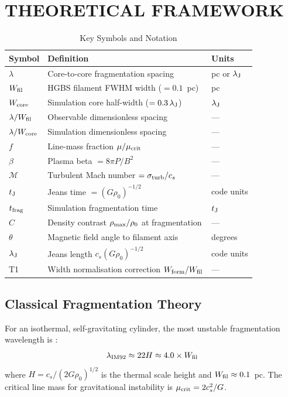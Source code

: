 \documentclass[twoside,twocolumn]{mnras}
\begin{document}
\section{THEORETICAL FRAMEWORK}

\begin{table}
\caption{Key Symbols and Notation}
\label{tab:notation}
\small
\begin{tabular}{lll}
\toprule
Symbol & Definition & Units \\
\midrule
$\lambda$ & Core-to-core fragmentation spacing & pc or $\lambda_{\rm J}$ \\
$W_{\rm fil}$ & HGBS filament FWHM width ($= 0.1$~pc) & pc \\
$W_{\rm core}$ & Simulation core half-width ($= 0.3\,\lambda_{\rm J}$) & $\lambda_{\rm J}$ \\
$\lambda/W_{\rm fil}$ & Observable dimensionless spacing & --- \\
$\lambda/W_{\rm core}$ & Simulation dimensionless spacing & --- \\
$f$ & Line-mass fraction $\mu/\mu_{\rm crit}$ & --- \\
$\beta$ & Plasma beta $= 8\pi P/B^2$ & --- \\
$\mathcal{M}$ & Turbulent Mach number $= \sigma_{\rm turb}/c_s$ & --- \\
$t_{\rm J}$ & Jeans time $= (G\rho_0)^{-1/2}$ & code units \\
$t_{\rm frag}$ & Simulation fragmentation time & $t_{\rm J}$ \\
$C$ & Density contrast $\rho_{\rm max}/\rho_0$ at fragmentation & --- \\
$\theta$ & Magnetic field angle to filament axis & degrees \\
$\lambda_{\rm J}$ & Jeans length $c_s(G\rho_0)^{-1/2}$ & code units \\
T1 & Width normalisation correction $W_{\rm form}/W_{\rm fil}$ & --- \\
\bottomrule
\end{tabular}
\end{table}

\subsection{Classical Fragmentation Theory}

For an isothermal, self-gravitating cylinder, the most unstable fragmentation wavelength
is \citep{Inutsuka1992}:
\begin{equation}
\lambda_{\rm IM92} \approx 22 H \approx 4.0 \times W_{\rm fil}
\label{eq:im92}
\end{equation}
where $H = c_s/(2G\rho_0)^{1/2}$ is the thermal scale height and $W_{\rm fil} \approx 0.1$~pc.
The critical line mass for gravitational instability is $\mu_{\rm crit} = 2c_s^2/G$.
\end{document}
